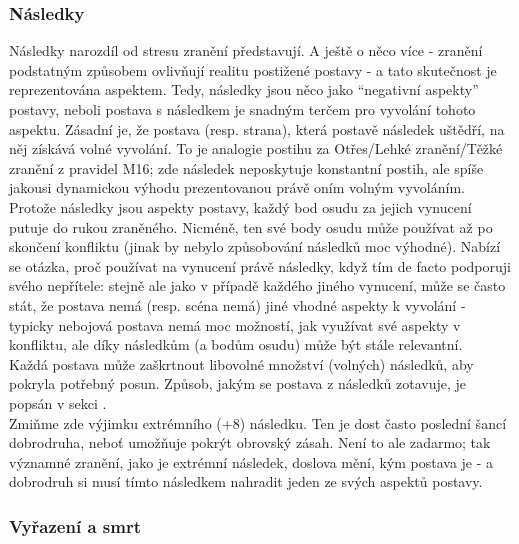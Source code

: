 \documentclass[../main.tex]{subfiles}
\begin{document}
\subsubsection{Následky}
\label{sec:následky}

Následky narozdíl od stresu zranění představují. A ještě o něco více - zranění podstatným způsobem ovlivňují realitu postižené postavy - a tato skutečnost je reprezentována aspektem. Tedy, následky jsou něco jako ``negativní aspekty'' postavy, neboli postava s následkem je snadným terčem pro vyvolání tohoto aspektu. Zásadní je, že postava (resp. strana), která postavě následek uštědří, na něj získává volné vyvolání. To je analogie postihu za Otřes/Lehké zranění/Těžké zranění z pravidel M16; zde následek neposkytuje konstantní postih, ale spíše jakousi dynamickou výhodu prezentovanou právě oním volným vyvoláním.\\
Protože následky jsou aspekty postavy, každý bod osudu za jejich vynucení putuje do rukou zraněného. Nicméně, ten své body osudu může používat až po skončení konfliktu (jinak by nebylo způsobování následků moc výhodné). Nabízí se otázka, proč používat na vynucení právě následky, když tím de facto podporuji svého nepřítele: stejně ale jako v případě každého jiného vynucení, může se často stát, že postava nemá (resp. scéna nemá) jiné vhodné aspekty k vyvolání - typicky nebojová postava nemá moc možností, jak využívat své aspekty v konfliktu, ale díky následkům (a bodům osudu) může být stále relevantní.\\
Každá postava může zaškrtnout libovolné množství (volných) následků, aby pokryla potřebný posun. Způsob, jakým se postava z následků zotavuje, je popsán v sekci .\\
Zmiňme zde výjimku extrémního (+8) následku. Ten je dost často poslední šancí dobrodruha, neboť umožňuje pokrýt obrovský zásah. Není to ale zadarmo; tak významné zranění, jako je extrémní následek, doslova mění, kým postava je - a dobrodruh si musí tímto následkem nahradit jeden ze svých aspektů postavy.


\subsubsection{Vyřazení a smrt}
\label{sec:vyrazeniasmrt}
\end{document}
